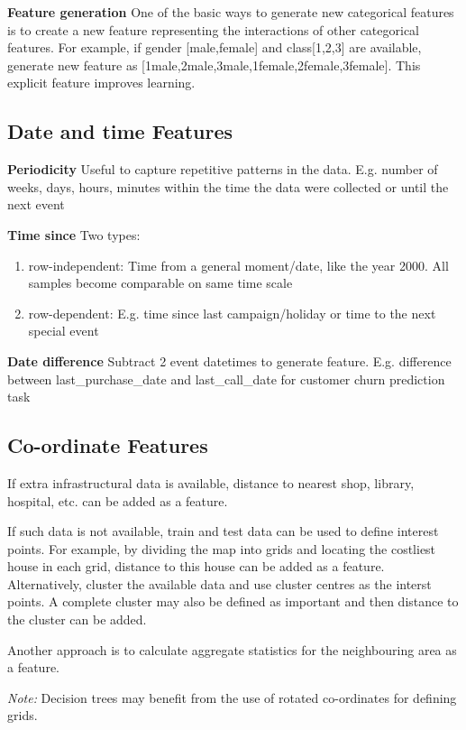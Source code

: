 \documentclass[a4paper]{article}
\begin{document}
\textbf{Feature generation} One of the basic ways to generate new categorical features is to create a new feature representing the interactions of other categorical features. For example, if gender [male,female] and class[1,2,3] are available, generate new feature as [1male,2male,3male,1female,2female,3female]. This explicit feature improves learning.

\subsection{Date and time Features}
\textbf{Periodicity} Useful to capture repetitive patterns in the data. E.g. number of weeks, days, hours, minutes within the time the data were collected or until the next event

\textbf{Time since} Two types:
\begin{enumerate}
\item row-independent: Time from a general moment/date, like the year 2000. All samples become comparable on same time scale
\item row-dependent: E.g. time since last campaign/holiday or time to the next special event
\end{enumerate}	

\textbf{Date difference} Subtract 2 event datetimes to generate feature. E.g. difference between last\_purchase\_date and last\_call\_date for customer churn prediction task

\subsection{Co-ordinate Features}
If extra infrastructural data is available, distance to nearest shop, library, hospital, etc. can be added as a feature.

If such data is not available, train and test data can be used to define interest points. For example, by dividing the map into grids and locating the costliest house in each grid, distance to this house can be added as a feature. Alternatively, cluster the available data and use cluster centres as the interst points. A complete cluster may also be defined as important and then distance to the cluster can be added.

Another approach is to calculate aggregate statistics for the neighbouring area as a feature.

\textit{Note:} Decision trees may benefit from the use of rotated co-ordinates for defining grids.
\end{document}
